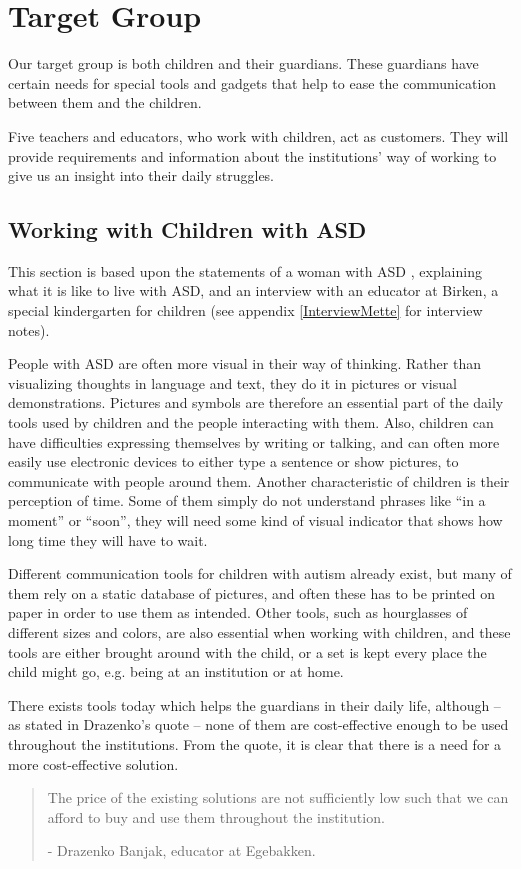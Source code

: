 \section{Target Group}
Our target group is both children and their guardians. These guardians have certain needs for special tools and gadgets that help to ease the communication between them and the children.

Five teachers and educators, who work with children, act as customers. They will provide requirements and information about the institutions' way of working to give us an insight into their daily struggles.

\subsection{Working with Children with ASD}
This section is based upon the statements of a woman with ASD \cite{autism.com}, explaining what it is like to live with ASD, and an interview with an educator at Birken, a special kindergarten for children (see appendix \ref{InterviewMette} for interview notes).

	People with ASD are often more visual in their way of thinking. Rather than visualizing thoughts in language and text, they do it in pictures or visual demonstrations. Pictures and symbols are therefore an essential part of the daily tools used by children and the people interacting with them. Also, children can have difficulties expressing themselves by writing or talking, and can often more easily use electronic devices to either type a sentence or show pictures, to communicate with people around them.
	Another characteristic of children is their perception of time. Some of them simply do not understand phrases like ``in a moment'' or ``soon'', they will need some kind of visual indicator that shows how long time they will have to wait.

Different communication tools for children with autism already exist, but many of them rely on a static database of pictures, and often these has to be printed on paper in order to use them as intended. Other tools, such as hourglasses of different sizes and colors, are also essential when working with children, and these tools are either brought around with the child, or a set is kept every place the child might go, e.g. being at an institution or at home.

There exists tools today which helps the guardians in their daily life, although -- as stated in Drazenko's quote -- none of them are cost-effective enough to be used throughout the institutions. From the quote, it is clear that there is a need for a more cost-effective solution.

\begin{quotation}
The price of the existing solutions are not sufficiently low such that we can afford to buy and use them throughout the institution.\\ 
	\begin{flushright}
		- Drazenko Banjak, educator at Egebakken.
	\end{flushright}
\end{quotation}